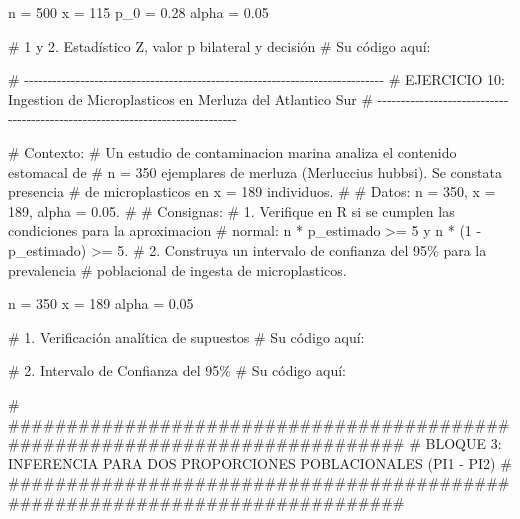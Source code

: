 \documentclass[
  spanish,
  letterpaper,
  DIV=11,
  numbers=noendperiod]{scrreprt}
\newenvironment{Shaded}{\begin{snugshade}}{\end{snugshade}}
\newcommand{\CommentTok}[1]{\textcolor[rgb]{0.37,0.37,0.37}{#1}}
\newcommand{\DecValTok}[1]{\textcolor[rgb]{0.68,0.00,0.00}{#1}}
\newcommand{\FloatTok}[1]{\textcolor[rgb]{0.68,0.00,0.00}{#1}}
\newcommand{\NormalTok}[1]{\textcolor[rgb]{0.00,0.23,0.31}{#1}}
\newcommand{\OtherTok}[1]{\textcolor[rgb]{0.00,0.23,0.31}{#1}}
\begin{document}
\begin{Shaded}
\begin{Highlighting}[]
\NormalTok{n }\OtherTok{=} \DecValTok{500}
\NormalTok{x }\OtherTok{=} \DecValTok{115}
\NormalTok{p\_0 }\OtherTok{=} \FloatTok{0.28}
\NormalTok{alpha }\OtherTok{=} \FloatTok{0.05}

\CommentTok{\# 1 y 2. Estadístico Z, valor p bilateral y decisión}
\CommentTok{\# Su código aquí:}



\CommentTok{\# {-}{-}{-}{-}{-}{-}{-}{-}{-}{-}{-}{-}{-}{-}{-}{-}{-}{-}{-}{-}{-}{-}{-}{-}{-}{-}{-}{-}{-}{-}{-}{-}{-}{-}{-}{-}{-}{-}{-}{-}{-}{-}{-}{-}{-}{-}{-}{-}{-}{-}{-}{-}{-}{-}{-}{-}{-}{-}{-}{-}{-}{-}{-}{-}{-}{-}{-}{-}{-}{-}{-}{-}{-}{-}{-}{-}{-}}
\CommentTok{\# EJERCICIO 10: Ingestion de Microplasticos en Merluza del Atlantico Sur}
\CommentTok{\# {-}{-}{-}{-}{-}{-}{-}{-}{-}{-}{-}{-}{-}{-}{-}{-}{-}{-}{-}{-}{-}{-}{-}{-}{-}{-}{-}{-}{-}{-}{-}{-}{-}{-}{-}{-}{-}{-}{-}{-}{-}{-}{-}{-}{-}{-}{-}{-}{-}{-}{-}{-}{-}{-}{-}{-}{-}{-}{-}{-}{-}{-}{-}{-}{-}{-}{-}{-}{-}{-}{-}{-}{-}{-}{-}{-}{-}}

\CommentTok{\# Contexto:}
\CommentTok{\# Un estudio de contaminacion marina analiza el contenido estomacal de}
\CommentTok{\# n = 350 ejemplares de merluza (Merluccius hubbsi). Se constata presencia}
\CommentTok{\# de microplasticos en x = 189 individuos.}
\CommentTok{\#}
\CommentTok{\# Datos: n = 350, x = 189, alpha = 0.05.}
\CommentTok{\#}
\CommentTok{\# Consignas:}
\CommentTok{\# 1. Verifique en R si se cumplen las condiciones para la aproximacion}
\CommentTok{\#    normal: n * p\_estimado \textgreater{}= 5 y n * (1 {-} p\_estimado) \textgreater{}= 5.}
\CommentTok{\# 2. Construya un intervalo de confianza del 95\% para la prevalencia}
\CommentTok{\#    poblacional de ingesta de microplasticos.}

\NormalTok{n }\OtherTok{=} \DecValTok{350}
\NormalTok{x }\OtherTok{=} \DecValTok{189}
\NormalTok{alpha }\OtherTok{=} \FloatTok{0.05}

\CommentTok{\# 1. Verificación analítica de supuestos}
\CommentTok{\# Su código aquí:}



\CommentTok{\# 2. Intervalo de Confianza del 95\%}
\CommentTok{\# Su código aquí:}



\CommentTok{\# \#\#\#\#\#\#\#\#\#\#\#\#\#\#\#\#\#\#\#\#\#\#\#\#\#\#\#\#\#\#\#\#\#\#\#\#\#\#\#\#\#\#\#\#\#\#\#\#\#\#\#\#\#\#\#\#\#\#\#\#\#\#\#\#\#\#\#\#\#\#\#\#\#\#\#\#\#}
\CommentTok{\# BLOQUE 3: INFERENCIA PARA DOS PROPORCIONES POBLACIONALES (PI1 {-} PI2)}
\CommentTok{\# \#\#\#\#\#\#\#\#\#\#\#\#\#\#\#\#\#\#\#\#\#\#\#\#\#\#\#\#\#\#\#\#\#\#\#\#\#\#\#\#\#\#\#\#\#\#\#\#\#\#\#\#\#\#\#\#\#\#\#\#\#\#\#\#\#\#\#\#\#\#\#\#\#\#\#\#\#}


\end{Highlighting}
\end{Shaded}
\end{document}
